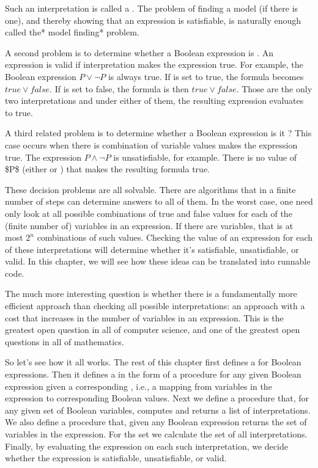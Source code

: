 \documentclass[letterpaper,10pt,english]{sphinxmanual}
\begin{document}
Such an interpretation is called a . The problem of finding a
model (if there is one), and thereby showing that an expression is
satisfiable, is naturally enough called the* model finding* problem.

A second problem is to determine whether a Boolean expression is
. An expression is valid if  interpretation makes the
expression true. For example, the Boolean expression \(P \lor
\neg P\) is always true. If  is set to true, the formula becomes
\(true \lor false\). If  is set to false, the formula is then
\(true \lor false\). Those are the only two interpretations and
under either of them, the resulting expression evaluates to true.

A third related problem is to determine whether a Boolean expression
is it ? This case occurs when there is  combination
of variable values makes the expression true. The expression \(P
\land \neg P\) is unsatisfiable, for example. There is no value of \$P\$
(either  or ) that makes the resulting formula true.

These decision problems are all solvable. There are algorithms that in
a finite number of steps can determine answers to all of them. In the
worst case, one need only look at all possible combinations of true
and false values for each of the (finite number of) variables in an
expression. If there are  variables, that is at most \(2^n\)
combinations of such values. Checking the value of an expression for
each of these interpretations will determine whether it’s satisfiable,
unsatisfiable, or valid. In this chapter, we will see how these ideas
can be translated into runnable code.

The much more interesting question is whether there is a fundamentally
more efficient approach than checking all possible interpretations: an
approach with a cost that increases  in the number of
variables in an expression. This is the greatest open question in all
of computer science, and one of the greatest open questions in all of
mathematics.

So let’s see how it all works. The rest of this chapter first defines
a  for Boolean expressions. Then it defines a  in
the form of a procedure for  any given Boolean expression
given a corresponding , i.e., a mapping from variables
in the expression to corresponding Boolean values. Next we define a
procedure that, for any given set of Boolean variables, computes and
returns a list of  interpretations. We also define a procedure
that, given any Boolean expression returns the set of variables in the
expression. For ths set we calculate the set of all interpretations.
Finally, by evaluating the expression on each such interpretation, we
decide whether the expression is satisfiable, unsatisfiable, or valid.
\end{document}
